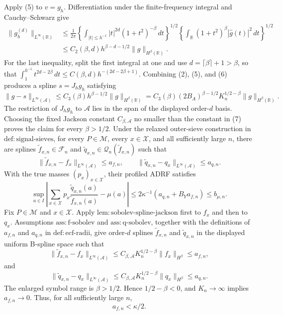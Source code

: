 Apply (5) to \(v=g_h\).  Differentiation under the finite-frequency integral and Cauchy--Schwarz give
\[
 \begin{aligned}
 \|g_h^{(d)}\|_{L^\infty(\mathbb R)}
 &\le \frac1{2\pi}
 \left\{\int_{|t|\le h^{-1}}|t|^{2d}(1+t^2)^{-\beta}\,dt\right\}^{1/2}
 \left\{\int_{\mathbb R}(1+t^2)^\beta|\widehat g(t)|^2\,dt\right\}^{1/2}\\
 &\le C_2(\beta,d)h^{\beta-d-1/2}
       \|g\|_{H^\beta(\mathbb R)}.                              \tag{6}
 \end{aligned}
\]
For the last inequality, split the first integral at one and use
\(d=\lceil\beta\rceil+1>\beta\), so that
\(\int_1^{h^{-1}}t^{2d-2\beta}\,dt\le C(\beta,d)h^{-(2d-2\beta+1)}\).
Combining (2), (5), and (6) produces a spline \(s=J_hg_h\) satisfying
\[
 \|g-s\|_{L^\infty(\mathcal A)}
 \le C_3(\beta)h^{\beta-1/2}\|g\|_{H^\beta(\mathbb R)}
 =C_3(\beta)(2B_A)^{\beta-1/2}K_n^{1/2-\beta}
   \|g\|_{H^\beta(\mathbb R)}.                                  \tag{7}
\]
The restriction of \(J_hg_h\) to \(\mathcal A\) lies in the span of the displayed order-\(d\) basis.  Choosing the fixed Jackson constant \(C_{\beta,\mathcal A}\) no smaller than the constant in (7) proves the claim for every \(\beta>1/2\).
Under the relaxed outer-sieve construction in \(\mathrm{def{:}signal\text{-}sieves}\), for every \(P\in\mathcal M\), every \(x\in\mathcal X\), and all sufficiently large \(n\), there are splines \(\widetilde f_{x,n}\in\mathscr F_n\) and \(\widetilde q_{x,n}\in\mathscr Q_n(\widetilde f_{x,n})\) such that
\[
 \|\widetilde f_{x,n}-f_x\|_{L^\infty(\mathcal A)}\le a_{f,n},
 \qquad
 \|\widetilde q_{x,n}-q_x\|_{L^\infty(\mathcal A)}\le a_{q,n}.
\]
With the true masses \((p_x)_{x\in\mathcal X}\), their profiled ADRF satisfies
\[
 \sup_{a\in I}\left|
 \sum_{x\in\mathcal X}p_x\frac{\widetilde q_{x,n}(a)}{\widetilde f_{x,n}(a)}-\mu(a)
 \right|
 \le 2\kappa^{-1}(a_{q,n}+B_Ya_{f,n})
 \le b_{\mu,n}.
\]
Fix \(P\in\mathcal M\) and \(x\in\mathcal X\).  Apply \(\mathrm{lem{:}sobolev\text{-}spline\text{-}jackson}\) first to \(f_x\) and then to \(q_x\).  Assumptions \(\mathrm{ass{:}f\text{-}sobolev}\) and \(\mathrm{ass{:}q\text{-}sobolev}\), together with the definitions of \(a_{f,n}\) and \(a_{q,n}\) in \(\mathrm{def{:}ecf\text{-}radii}\), give order-\(d\) splines \(\widetilde f_{x,n}\) and \(\widetilde q_{x,n}\) in the displayed uniform B-spline space such that
\[
 \|\widetilde f_{x,n}-f_x\|_{L^\infty(\mathcal A)}
 \le C_{\beta,\mathcal A}K_n^{1/2-\beta}\|f_x\|_{H^\beta}
 \le a_{f,n},                                                     \tag{1}
\]
and
\[
 \|\widetilde q_{x,n}-q_x\|_{L^\infty(\mathcal A)}
 \le C_{\beta,\mathcal A}K_n^{1/2-\beta}\|q_x\|_{H^\beta}
 \le a_{q,n}.                                                     \tag{2}
\]
The enlarged symbol range is \(\beta>1/2\).  Hence \(1/2-\beta<0\), and \(K_n\to\infty\) implies \(a_{f,n}\to0\).  Thus, for all sufficiently large \(n\),
\[
 a_{f,n}<\kappa/2.                                                \tag{3}
\]

